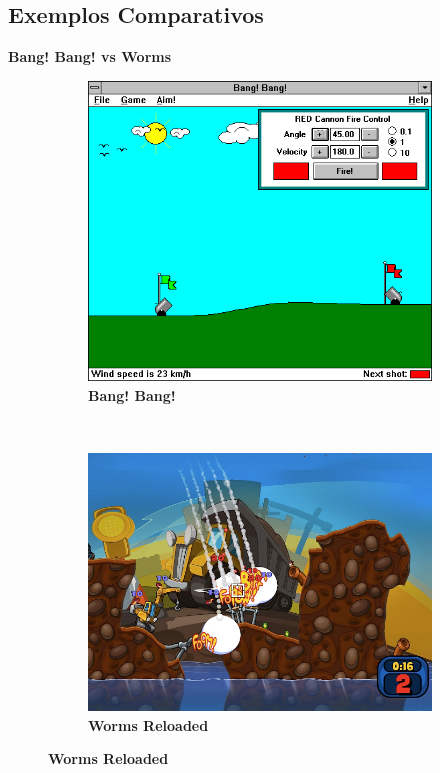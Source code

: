 \expandafter\documentclass\expandafter[table, usenames, svgnames, dvipsnames, \classopts]{beamer}
\begin{document}
\subsection{Exemplos Comparativos}

\begin{frame}{\textbf{Bang! Bang! vs Worms}}

	\begin{figure}
	    \centering

	    \begin{subfigure}[!h]{0.4\paperwidth}
	    	\centering
	    	\includegraphics[draft,height=0.4\paperheight]{bang_bang}
	        \caption{\scriptsize\textbf{Bang! Bang!}\footnotemark{}}
	    \end{subfigure}
	    ~
		\begin{subfigure}[!h]{0.4\paperwidth}
			\centering
	        \includegraphics[draft,height=0.4\paperheight]{worms}
	        \caption{\scriptsize\textbf{Worms Reloaded}\footnotemark{}}
	    \end{subfigure}
    \end{figure}


\end{frame}
\end{document}
